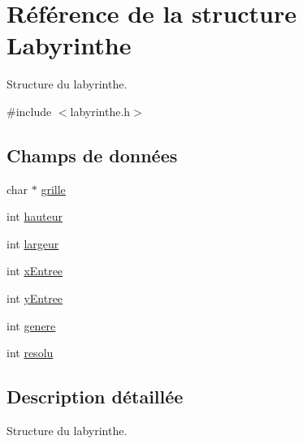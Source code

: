 \hypertarget{structLabyrinthe}{\section{Référence de la structure Labyrinthe}
\label{structLabyrinthe}
}


Structure du labyrinthe.  




{\ttfamily \#include $<$labyrinthe.\-h$>$}

\subsection*{Champs de données}
\begin{DoxyCompactItemize}
\item 
char $\ast$ \hyperlink{structLabyrinthe_a5a95fe6fa4f565d397c586f3b5988ab1}{grille}
\item 
int \hyperlink{structLabyrinthe_ab7faa6700dd69e633b1d6c1c8d1974a1}{hauteur}
\item 
int \hyperlink{structLabyrinthe_a23007607a374817790805e23ed1be08c}{largeur}
\item 
int \hyperlink{structLabyrinthe_a58b3b04b825e29eaa7b3e8750261dcd1}{x\-Entree}
\item 
int \hyperlink{structLabyrinthe_ad004da5f699104c8df81a4a88fc8e53a}{y\-Entree}
\item 
int \hyperlink{structLabyrinthe_ac74b66a45b9e340fcb9857701316d348}{genere}
\item 
int \hyperlink{structLabyrinthe_ad27777cb14b150736ce76ce2182b2968}{resolu}
\end{DoxyCompactItemize}


\subsection{Description détaillée}
Structure du labyrinthe. 

